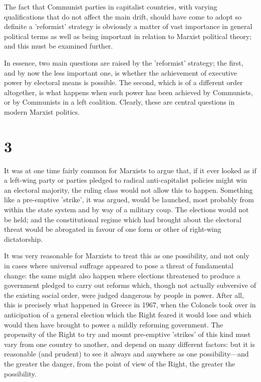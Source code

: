 The fact that Communist parties in capitalist countries, with varying qualifications that do not affect the main drift, should have come to adopt so definite a 'reformist' strategy is obviously a matter of vast importance in general political terms as well as being important in relation to Marxist political theory; and this must be examined further.

In essence, two main questions are raised by the 'reformist' strategy; the first, and by now the less important one, is whether the achievement of executive power by electoral means is possible. The second, which is of a different order altogether, is what happens when such power has been achieved by Communists, or by Communists in a left coalition. Clearly, these are central questions in modern Marxist politics.

\section*{3}
It was at one time fairly common for Marxists to argue that, if it ever looked as if a left-wing party or parties pledged to radical anti\hyp{}capitalist policies might win an electoral majority, the ruling class would not allow this to happen. Something like a pre\hyp{}emptive 'strike', it was argued, would be launched, most probably from within the state system and by way of a military coup. The elections would not be held; and the constitutional regime which had brought about the electoral threat would be abrogated in favour of one form or other of right-wing dictatorship.

It was very reasonable for Marxists to treat this as one possibility, and not only in cases where universal suffrage appeared to pose a threat of fundamental change: the same might also happen where elections threatened to produce a government pledged to carry out reforms which, though not actually subversive of the existing social order, were judged dangerous by people in power. After all, this is precisely what happened in Greece in 1967, when the Colonels took over in anticipation of a general election which the Right feared it would lose and which would then have brought to power a mildly reforming government. The propensity of the Right to try and mount pre-emptive 'strikes' of this kind must vary from one country to another, and depend on many different factors: but it is reasonable (and prudent) to see it always and anywhere as one possibility—and the greater the danger, from the point of view of the Right, the greater the possibility.

